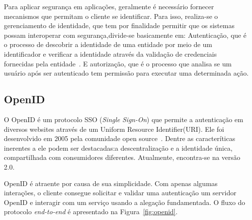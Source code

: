 Para aplicar segurança em aplicações, geralmente é necessário fornecer mecanismos que permitam o cliente se identificar. Para isso, realiza-se o gerenciamento de identidade, que tem por finalidade permitir que os sistemas possam interoperar com segurança,divide-se basicamente em: Autenticação, que é o processo de descobrir a identidade de uma entidade por meio de um identificador e verificar a identidade através da validação de credenciais fornecidas pela entidade~\cite{lakshmiraghavan2013pro}. E autorização, que é o processo que analisa se um usuário após ser autenticado tem permissão para executar uma determinada ação.%



\subsection{OpenID}

O OpenID é um protocolo SSO (\emph{Single Sign-On}) que  permite a  autenticação em diversos websites através de um Uniform Resource Identifier(URI). Ele foi desenvolvido em 2005 pela comunidade open source~\cite{Recordon2006}. Dentre as caracteríticas inerentes a ele podem ser destacadas:a descentralização e a identidade única, compartilhada com consumidores diferentes. Atualmente, encontra-se na versão 2.0.

OpenID é atraente por causa de sua simplicidade. Com apenas algumas interações, o cliente consegue solicitar e validar  uma autenticação um servidor OpenID e interagir com um serviço usando a alegação fundamentada. O fluxo do protocolo \emph{end-to-end} é apresentado na Figura~\ref{fig:openid}.

